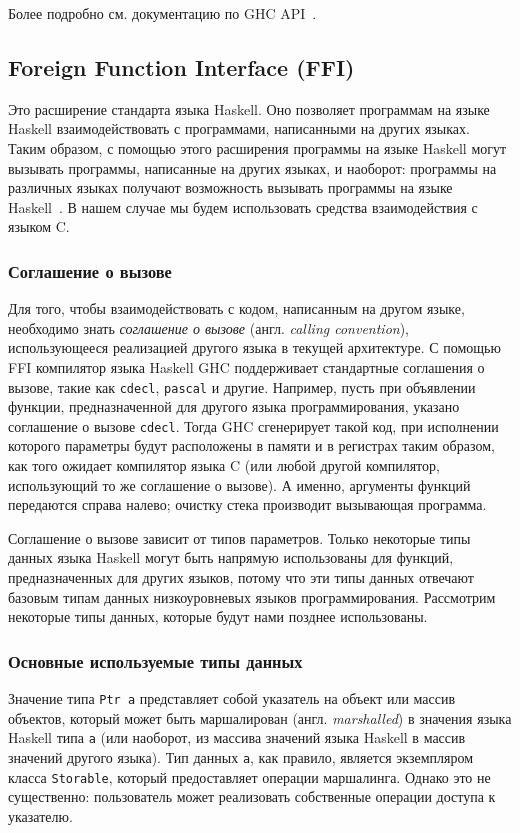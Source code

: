 	Более подробно см. документацию по GHC API~\autocite{apidoc}. %
	\subsection{Foreign Function Interface (FFI)} Это расширение стандарта языка Haskell. Оно позволяет программам на языке Haskell взаимодействовать с программами, написанными на других языках. Таким образом, с помощью этого расширения программы на языке Haskell могут вызывать программы, написанные на других языках, и наоборот: программы на различных языках получают возможность вызывать программы на языке Haskell~\autocite{ffi}. В нашем случае мы будем использовать средства взаимодействия с языком C. 
	
	\subsubsection{Соглашение о вызове} Для того, чтобы взаимодействовать с кодом, написанным на другом языке, необходимо знать \textit{соглашение о вызове} (англ. \textit{calling convention}), использующееся реализацией другого языка в текущей архитектуре. С помощью FFI компилятор языка Haskell GHC поддерживает стандартные соглашения о вызове, такие как \lstinline{cdecl}, \lstinline{pascal} и другие. Например, пусть при объявлении функции, предназначенной для другого языка программирования, указано соглашение о вызове \lstinline{cdecl}. Тогда GHC сгенерирует такой код, при исполнении которого параметры будут расположены в памяти и в регистрах таким образом, как того ожидает компилятор языка C (или любой другой компилятор, использующий то же соглашение о вызове). А именно, аргументы функций передаются справа налево; очистку стека производит вызывающая программа.
	
	Соглашение о вызове зависит от типов параметров. Только некоторые типы данных языка Haskell могут быть напрямую использованы для функций, предназначенных для других языков, потому что эти типы данных отвечают базовым типам данных низкоуровневых языков программирования. Рассмотрим некоторые типы данных, которые будут нами позднее использованы.
	
	\subsubsection{Основные используемые типы данных} Значение типа \lstinline{Ptr a} представляет собой указатель на объект или массив объектов, который может быть маршалирован (англ. \textit{marshalled}) в значения языка Haskell типа \lstinline{a} (или наоборот, из массива значений языка Haskell в массив значений другого языка). Тип данных \lstinline{a}, как правило, является экземпляром класса \lstinline{Storable}, который предоставляет операции маршалинга. Однако это не существенно: пользователь может реализовать собственные операции доступа к указателю.
	
